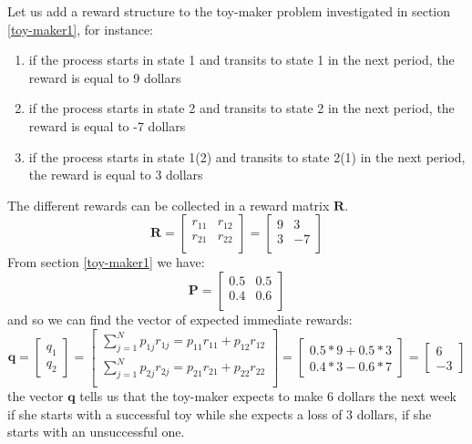 \documentclass[../main.tex]{subfiles}
\begin{document}
\begin{small}
Let us add a reward structure to the toy-maker problem investigated in section \ref{toy-maker1}, for instance:
\begin{enumerate}
    \item if the process starts in state 1 and transits to state 1 in the next period, the reward is equal to 9 dollars
     \item if the process starts in state 2 and transits to state 2 in the next period, the reward is equal to -7 dollars
      \item if the process starts in state 1(2) and transits to state 2(1) in the next period, the reward is equal to 3 dollars
\end{enumerate}
The different rewards can be collected in a reward matrix $\mathbf{R}$.
\begin{equation}
\mathbf{R} = 
\begin{bmatrix}
r_{11} & r_{12}\\
r_{21} & r_{22}\\
\end{bmatrix} =
\begin{bmatrix}
9 & 3\\
3 & -7\\
\end{bmatrix}
\end{equation}
From section \ref{toy-maker1} we have:
\begin{equation}
\mathbf{P} = 
\begin{bmatrix}
0.5 & 0.5\\
0.4 & 0.6\\
\end{bmatrix}
\end{equation}
and so we can find the vector of expected immediate rewards:
\begin{equation}
    \mathbf{q} = 
    \begin{bmatrix}
    q_1\\
    q_2
    \end{bmatrix} =
    \begin{bmatrix}
    \sum_{j=1}^N p_{1j}r_{1j} = p_{11}r_{11} + p_{12}r_{12}\\
    \sum_{j=1}^N p_{2j}r_{2j} = p_{21}r_{21} + p_{22}r_{22}\\
    \end{bmatrix}=
     \begin{bmatrix}
    0.5*9 + 0.5*3\\
    0.4*3 - 0.6*7
    \end{bmatrix}=
     \begin{bmatrix}
    6\\
    -3
    \end{bmatrix}
\end{equation}
the vector $\mathbf{q}$ tells us that the toy-maker expects to make 6 dollars the next week if she starts with a successful toy while she expects a loss of 3 dollars, if she starts with an unsuccessful one.\\


\end{small}
\end{document}
